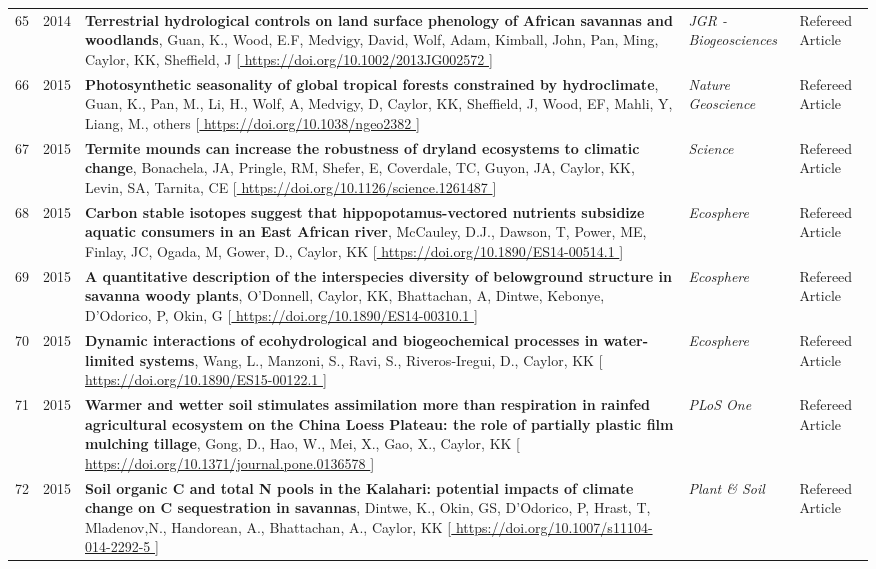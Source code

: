 \begin{supertabular}{lcp{8.25cm}p{4.75cm}p{1.75cm}}
65 & 2014 & {\bf Terrestrial hydrological controls on land surface phenology of African savannas and woodlands}, Guan, K., Wood, E.F, Medvigy, David, Wolf, Adam, Kimball, John, Pan, Ming, Caylor, KK, Sheffield, J [\url{ https://doi.org/10.1002/2013JG002572 }] & \emph{ JGR - Biogeosciences } & Refereed Article\\
66 & 2015 & {\bf Photosynthetic seasonality of global tropical forests constrained by hydroclimate}, Guan, K., Pan, M., Li, H., Wolf, A, Medvigy, D, Caylor, KK, Sheffield, J, Wood, EF, Mahli, Y, Liang, M., others [\url{ https://doi.org/10.1038/ngeo2382 }] & \emph{ Nature Geoscience } & Refereed Article\\
67 & 2015 & {\bf Termite mounds can increase the robustness of dryland ecosystems to climatic change}, Bonachela, JA, Pringle, RM, Shefer, E, Coverdale, TC, Guyon, JA, Caylor, KK, Levin, SA, Tarnita, CE [\url{ https://doi.org/10.1126/science.1261487 }] & \emph{ Science } & Refereed Article\\
68 & 2015 & {\bf Carbon stable isotopes suggest that hippopotamus-vectored nutrients subsidize aquatic consumers in an East African river}, McCauley, D.J., Dawson, T, Power, ME, Finlay, JC, Ogada, M, Gower, D., Caylor, KK [\url{ https://doi.org/10.1890/ES14-00514.1 }] & \emph{ Ecosphere } & Refereed Article\\
69 & 2015 & {\bf A quantitative description of the interspecies diversity of belowground structure in savanna woody plants}, O'Donnell, Caylor, KK, Bhattachan, A, Dintwe, Kebonye, D'Odorico, P, Okin, G [\url{ https://doi.org/10.1890/ES14-00310.1 }] & \emph{ Ecosphere } & Refereed Article\\
70 & 2015 & {\bf Dynamic interactions of ecohydrological and biogeochemical processes in water-limited systems}, Wang, L., Manzoni, S., Ravi, S., Riveros-Iregui, D., Caylor, KK [\url{ https://doi.org/10.1890/ES15-00122.1 }] & \emph{ Ecosphere } & Refereed Article\\
71 & 2015 & {\bf Warmer and wetter soil stimulates assimilation more than respiration in rainfed agricultural ecosystem on the China Loess Plateau: the role of partially plastic film mulching tillage}, Gong, D., Hao, W., Mei, X., Gao, X., Caylor, KK [\url{ https://doi.org/10.1371/journal.pone.0136578 }] & \emph{ PLoS One } & Refereed Article\\
72 & 2015 & {\bf Soil organic C and total N pools in the Kalahari: potential impacts of climate change on C sequestration in savannas}, Dintwe, K., Okin, GS, D'Odorico, P, Hrast, T, Mladenov,N., Handorean, A., Bhattachan, A., Caylor, KK [\url{ https://doi.org/10.1007/s11104-014-2292-5 }] & \emph{ Plant \& Soil } & Refereed Article\\

\end{supertabular}
